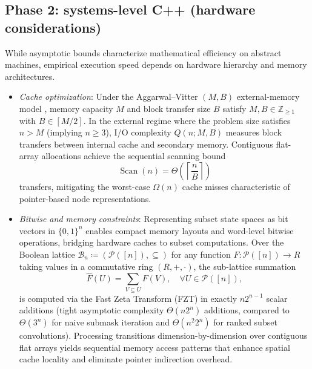 \documentclass[10pt, letterpaper]{article}
\begin{document}
\subsection{Phase 2: systems-level C++ (hardware considerations) \texorpdfstring{\cite{stroustrup2013c}}{}}\label{sec:phase2_cpp}
While asymptotic bounds characterize mathematical efficiency on abstract machines, empirical execution speed depends on hardware hierarchy and memory architectures.
\begin{itemize}
    \item \textit{Cache optimization}: Under the Aggarwal--Vitter $(M, B)$ external-memory model \cite{aggarwal1988input}, memory capacity $M$ and block transfer size $B$ satisfy $M, B \in \mathbb{Z}_{\ge 1}$ with $B\in[M/2]$. In the external regime where the problem size satisfies $n > M$ (implying $n \ge 3$), I/O complexity $Q(n; M, B)$ measures block transfers between internal cache and secondary memory. Contiguous flat-array allocations achieve the sequential scanning bound
	\begin{equation}\label{eq:scan_bound}
		\operatorname{Scan}(n) = \Theta\left(\left\lceil \frac{n}{B} \right\rceil\right)
	\end{equation}
	transfers, mitigating the worst-case $\Omega(n)$ cache misses characteristic of pointer-based node representations.
    \item \textit{Bitwise and memory constraints}: Representing subset state spaces as bit vectors in $\{0, 1\}^n$ enables compact memory layouts and word-level bitwise operations, bridging hardware caches to subset computations. Over the Boolean lattice $\mathcal{B}_n \coloneqq (\mathcal{P}([n]), \subseteq)$ for any function $F: \mathcal{P}([n]) \to R$ taking values in a commutative ring $(R, +, \cdot)$, the sub-lattice summation
	\begin{equation}\label{eq:fzt_transform}
		\hat{F}(U) = \sum_{V \subseteq U} F(V), \quad \forall U \in \mathcal{P}([n]),
	\end{equation}
	is computed via the Fast Zeta Transform (FZT) in exactly $n 2^{n-1}$ scalar additions (tight asymptotic complexity $\Theta(n 2^n)$ additions, compared to $\Theta(3^n)$ for naive submask iteration and $\Theta(n^2 2^n)$ for ranked subset convolutions). Processing transitions dimension-by-dimension over contiguous flat arrays yields sequential memory access patterns that enhance spatial cache locality and eliminate pointer indirection overhead.
\end{itemize}
\end{document}
